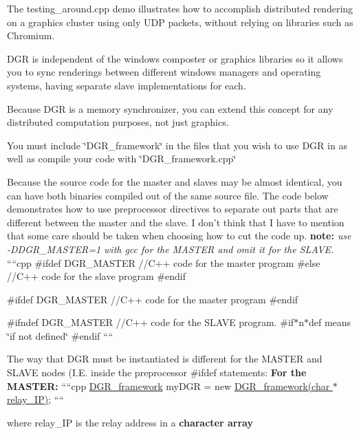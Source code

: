 \begin{DoxyItemize}
\item The testing\+\_\+around.\+cpp demo illustrates how to accomplish distributed rendering on a graphics cluster using only U\+D\+P packets, without relying on libraries such as Chromium.
\item D\+G\+R is independent of the windows composter or graphics libraries so it allows you to sync renderings between different windows managers and operating systems, having separate slave implementations for each.
\item Because D\+G\+R is a memory synchronizer, you can extend this concept for any distributed computation purposes, not just graphics.
\item You must include \char`\"{}\+D\+G\+R\+\_\+framework\char`\"{} in the files that you wish to use D\+G\+R in as well as compile your code with \char`\"{}\+D\+G\+R\+\_\+framework.\+cpp\char`\"{}
\item Because the source code for the master and slaves may be almost identical, you can have both binaries compiled out of the same source file. The code below demonstrates how to use preprocessor directives to separate out parts that are different between the master and the slave. I don't think that I have to mention that some care should be taken when choosing how to cut the code up. {\bfseries note\+:} {\itshape use -\/\+D\+D\+G\+R\+\_\+\+M\+A\+S\+T\+E\+R=1 with gcc for the M\+A\+S\+T\+E\+R and omit it for the S\+L\+A\+V\+E.} ````cpp \#ifdef D\+G\+R\+\_\+\+M\+A\+S\+T\+E\+R //\+C++ code for the master program \#else //\+C++ code for the slave program \#endif

\#ifdef D\+G\+R\+\_\+\+M\+A\+S\+T\+E\+R //\+C++ code for the master program \#endif

\#ifndef D\+G\+R\+\_\+\+M\+A\+S\+T\+E\+R //\+C++ code for the S\+L\+A\+V\+E program. \#if$\ast$n$\ast$def means \char`\"{}if not defined\char`\"{} \#endif ````
\item The way that D\+G\+R must be instantiated is different for the M\+A\+S\+T\+E\+R and S\+L\+A\+V\+E nodes (I.\+E. inside the preprocessor {\ttfamily \#ifdef} statements\+: {\bfseries For the M\+A\+S\+T\+E\+R\+:} ````cpp \hyperlink{classDGR__framework}{D\+G\+R\+\_\+framework} my\+D\+G\+R = new \hyperlink{classDGR__framework}{D\+G\+R\+\_\+framework(char $\ast$ relay\+\_\+\+I\+P)}; ````

where {\ttfamily relay\+\_\+\+I\+P} is the relay address in a {\bfseries character array}


\end{DoxyItemize}
